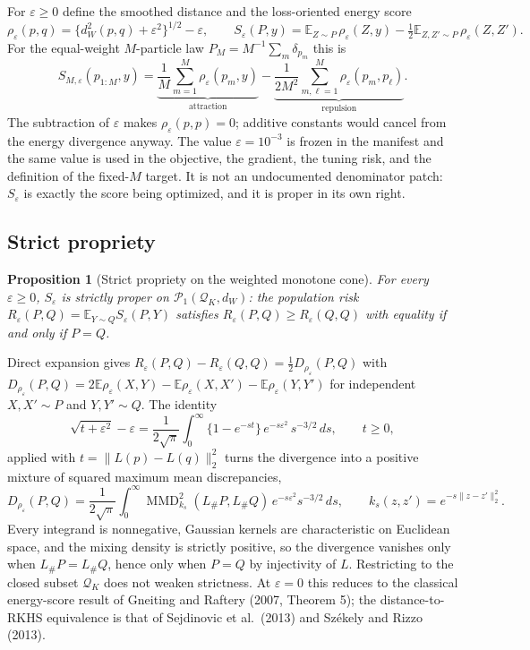 \documentclass[11pt,a4paper]{article}
\newtheorem{proposition}{Proposition}
\theoremstyle{definition}
\theoremstyle{remark}
\newcommand{\Pcal}{\mathcal{P}}
\newcommand{\Qcal}{\mathcal{Q}}
\newcommand{\Exp}{\mathbb{E}}
\newcommand{\dW}{d_W}
\begin{document}
For $\varepsilon \geq 0$ define the smoothed distance and the loss-oriented
energy score
\[
\rho_\varepsilon(p,q) = \bigl\{\dW^2(p,q) + \varepsilon^2\bigr\}^{1/2} - \varepsilon,
\qquad
S_\varepsilon(P, y) = \Exp_{Z \sim P}\, \rho_\varepsilon(Z, y)
 - \tfrac12 \Exp_{Z, Z' \sim P}\, \rho_\varepsilon(Z, Z').
\]
For the equal-weight $M$-particle law $P_M = M^{-1}\sum_m \delta_{p_m}$ this is
\begin{equation}
S_{M,\varepsilon}(p_{1:M}, y)
= \underbrace{\frac{1}{M}\sum_{m=1}^M \rho_\varepsilon(p_m, y)}_{\text{attraction}}
- \underbrace{\frac{1}{2M^2}\sum_{m,\ell=1}^M \rho_\varepsilon(p_m, p_\ell)}_{\text{repulsion}} .
\label{eq:score}
\end{equation}
The subtraction of $\varepsilon$ makes $\rho_\varepsilon(p,p) = 0$; additive
constants would cancel from the energy divergence anyway. The value
$\varepsilon = 10^{-3}$ is frozen in the manifest and the same value is used in
the objective, the gradient, the tuning risk, and the definition of the
fixed-$M$ target. It is not an undocumented denominator patch: $S_\varepsilon$
is exactly the score being optimized, and it is proper in its own right.

\subsection{Strict propriety}

\begin{proposition}[Strict propriety on the weighted monotone cone]
For every $\varepsilon \geq 0$, $S_\varepsilon$ is strictly proper on
$\Pcal_1(\Qcal_K, \dW)$: the population risk
$R_\varepsilon(P,Q) = \Exp_{Y \sim Q} S_\varepsilon(P,Y)$ satisfies
$R_\varepsilon(P,Q) \geq R_\varepsilon(Q,Q)$ with equality if and only if
$P = Q$.
\end{proposition}

\noindent Direct expansion gives
$R_\varepsilon(P,Q) - R_\varepsilon(Q,Q) = \tfrac12 D_{\rho_\varepsilon}(P,Q)$
with
$D_{\rho_\varepsilon}(P,Q) = 2\Exp \rho_\varepsilon(X,Y) - \Exp\rho_\varepsilon(X,X') - \Exp\rho_\varepsilon(Y,Y')$
for independent $X, X' \sim P$ and $Y, Y' \sim Q$. The identity
\[
\sqrt{t + \varepsilon^2} - \varepsilon
= \frac{1}{2\sqrt\pi}\int_0^\infty \{1 - e^{-st}\}\, e^{-s\varepsilon^2}\, s^{-3/2}\, ds,
\qquad t \geq 0,
\]
applied with $t = \|L(p) - L(q)\|_2^2$ turns the divergence into a positive
mixture of squared maximum mean discrepancies,
\[
D_{\rho_\varepsilon}(P,Q)
= \frac{1}{2\sqrt\pi}\int_0^\infty \operatorname{MMD}^2_{k_s}(L_\# P, L_\# Q)\,
e^{-s\varepsilon^2} s^{-3/2}\, ds,
\qquad k_s(z,z') = e^{-s\|z - z'\|_2^2}.
\]
Every integrand is nonnegative, Gaussian kernels are characteristic on Euclidean
space, and the mixing density is strictly positive, so the divergence vanishes
only when $L_\#P = L_\#Q$, hence only when $P = Q$ by injectivity of $L$.
Restricting to the closed subset $\Qcal_K$ does not weaken strictness. At
$\varepsilon = 0$ this reduces to the classical energy-score result of Gneiting
and Raftery (2007, Theorem 5); the distance-to-RKHS equivalence is that of
Sejdinovic et al.\ (2013) and Sz\'ekely and Rizzo (2013).
\end{document}
